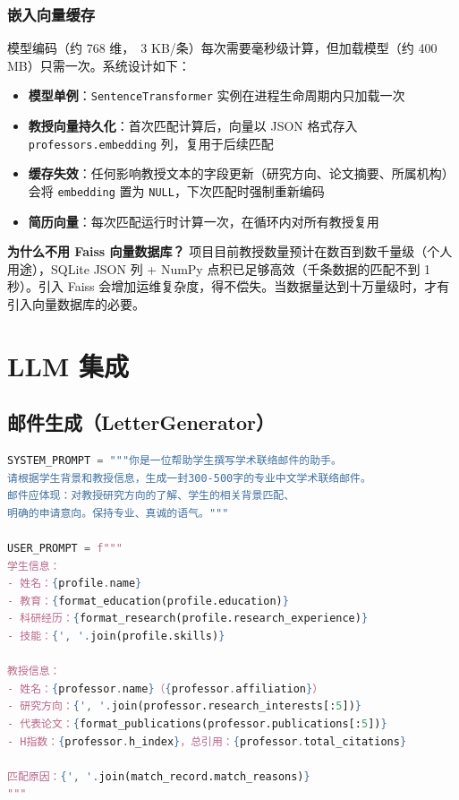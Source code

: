 \documentclass[11pt]{article}
\begin{document}
\subsubsection{嵌入向量缓存}

模型编码（约 768 维，~3 KB/条）每次需要毫秒级计算，但加载模型（约 400 MB）只需一次。系统设计如下：

\begin{itemize}
    \item \textbf{模型单例}：\texttt{SentenceTransformer} 实例在进程生命周期内只加载一次
    \item \textbf{教授向量持久化}：首次匹配计算后，向量以 JSON 格式存入 \texttt{professors.embedding} 列，复用于后续匹配
    \item \textbf{缓存失效}：任何影响教授文本的字段更新（研究方向、论文摘要、所属机构）会将 \texttt{embedding} 置为 \texttt{NULL}，下次匹配时强制重新编码
    \item \textbf{简历向量}：每次匹配运行时计算一次，在循环内对所有教授复用
\end{itemize}

\begin{thinkquestion}
\textbf{为什么不用 Faiss 向量数据库？} 项目目前教授数量预计在数百到数千量级（个人用途），SQLite JSON 列 + NumPy 点积已足够高效（千条数据的匹配不到 1 秒）。引入 Faiss 会增加运维复杂度，得不偿失。当数据量达到十万量级时，才有引入向量数据库的必要。
\end{thinkquestion}

\section{LLM 集成}

\subsection{邮件生成（LetterGenerator）}

\begin{lstlisting}[language=Python, caption=邮件生成 Prompt 设计]
SYSTEM_PROMPT = """你是一位帮助学生撰写学术联络邮件的助手。
请根据学生背景和教授信息，生成一封300-500字的专业中文学术联络邮件。
邮件应体现：对教授研究方向的了解、学生的相关背景匹配、
明确的申请意向。保持专业、真诚的语气。"""

USER_PROMPT = f"""
学生信息：
- 姓名：{profile.name}
- 教育：{format_education(profile.education)}
- 科研经历：{format_research(profile.research_experience)}
- 技能：{', '.join(profile.skills)}

教授信息：
- 姓名：{professor.name}（{professor.affiliation}）
- 研究方向：{', '.join(professor.research_interests[:5])}
- 代表论文：{format_publications(professor.publications[:5])}
- H指数：{professor.h_index}，总引用：{professor.total_citations}

匹配原因：{', '.join(match_record.match_reasons)}
"""
\end{lstlisting}
\end{document}
